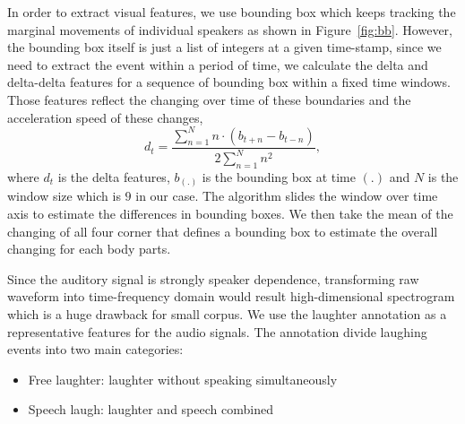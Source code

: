 \documentclass[10pt,journal,compsoc]{IEEEtran}
\begin{document}
In order to extract visual features, we use bounding box which keeps tracking the marginal movements of individual speakers as shown in Figure~\ref{fig:bb}. However, the bounding box itself is just a list of integers at a given time-stamp, since we need to extract the event within a period of time, we calculate the delta and delta-delta features for a sequence of bounding box within a fixed time windows. Those features reflect the changing over time of these boundaries and the acceleration speed of these changes,
\[
d_t = \frac{\sum_{n=1}^N n\cdot(b_{t+n} - b_{t-n})}{2 \sum_{n=1}^{N} n^2},
\]
where $d_t$ is the delta features, $b_{(.)}$ is the bounding box at time $(.)$ and $N$ is the window size which is $9$ in our case. The algorithm slides the window over time axis to estimate the differences in bounding boxes. We then take the mean of the changing of all four corner that defines a bounding box to estimate the overall changing for each body parts.

Since the auditory signal is strongly speaker dependence, transforming raw waveform into time-frequency domain would result high-dimensional spectrogram which is a huge drawback for small corpus. We use the laughter annotation as a representative features for the audio signals. The annotation divide laughing events into two main categories:
\begin{itemize}
    \item Free laughter: laughter without speaking simultaneously
    \item Speech laugh: laughter and speech combined
\end{itemize}


\end{document}
